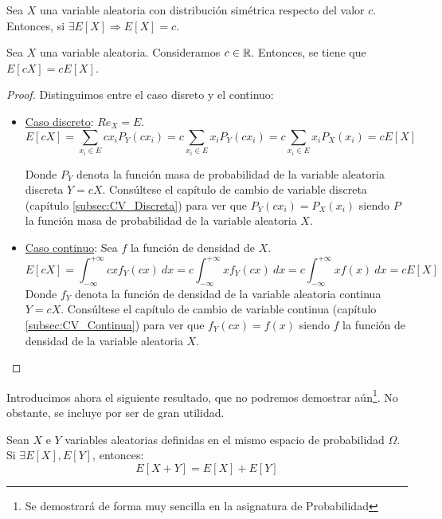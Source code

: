 \begin{prop}
    Sea $X$ una variable aleatoria con distribución simétrica respecto del valor $c$. Entonces, si $\exists E[X]\Longrightarrow E[X]=c$.
\end{prop}

\begin{prop}
    Sea $X$ una variable aleatoria. Consideramos $c \in \mathbb R$. Entonces, se tiene que $E[cX] = cE[X]$.
\end{prop}
\begin{proof}
    Distinguimos entre el caso disreto y el continuo:
    \begin{itemize}
        \item \underline{Caso discreto}: $Re_X = E$.
        $$E[cX] = \sum_{x_i \in E} c x_i P_Y(c x_i) = c \sum_{x_i \in E} x_i P_Y(c  x_i) = c
        \sum_{x_i \in E} x_i P_X(x_i) = cE[X]$$
        
        Donde $P_Y$ denota la función masa de probabilidad de la variable aleatoria discreta $Y=cX$. Consúltese el capítulo de cambio de variable discreta (capítulo \ref{subsec:CV_Discreta}) para ver que $P_Y(cx_i) = P_X(x_i)$ siendo $P$ la función masa de probabilidad de la variable aleatoria $X$.

        \item \underline{Caso continuo}: Sea $f$ la función de densidad de $X$.
        $$E[cX] = \int_{-\infty}^{+\infty} cx f_Y(cx)~dx = c \int_{-\infty}^{+\infty} x f_Y(cx)~dx = c \int_{-\infty}^{+\infty} x f(x)~dx = cE[X]$$
        Donde $f_Y$ denota la función de densidad de la variable aleatoria continua $Y=cX$. Consúltese el capítulo de cambio de variable continua (capítulo \ref{subsec:CV_Continua}) para ver que $f_Y(cx) = f(x)$ siendo $f$ la función de densidad de la variable aleatoria $X$.
    \end{itemize}
\end{proof}

Introducimos ahora el siguiente resultado, que no podremos demostrar aún\footnote{Se demostrará de forma muy sencilla en la asignatura de Probabilidad}. No obstante, se incluye por ser de gran utilidad.
\begin{prop}
    Sean $X$ e $Y$ variables aleatorias definidas en el mismo espacio de probabilidad $\Omega$. Si $\exists E[X], E[Y]$, entonces:
    $$E[X+Y]=E[X]+E[Y]$$
\end{prop}


